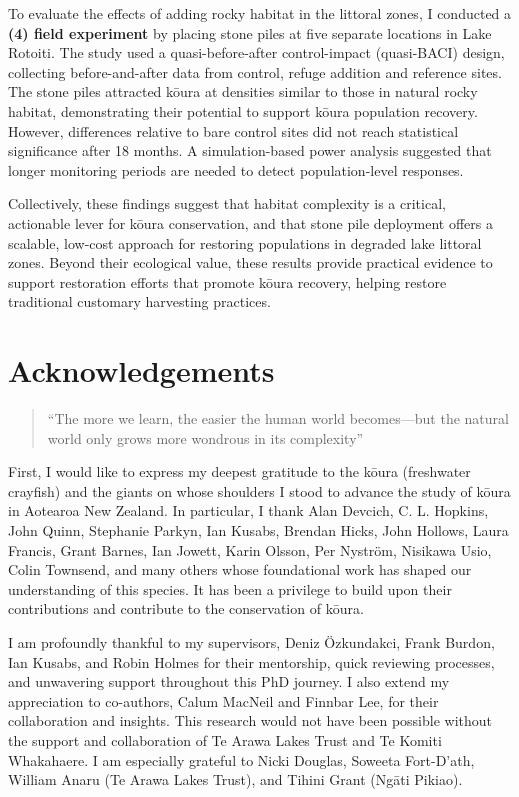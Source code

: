 \documentclass[
  12pt,
  a4paper,
  oneside]{scrbook}
\begin{document}
To evaluate the effects of adding rocky habitat in the littoral zones, I
conducted a \textbf{(4) field experiment} by placing stone piles at five
separate locations in Lake Rotoiti. The study used a quasi-before-after
control-impact (quasi-BACI) design, collecting before-and-after data
from control, refuge addition and reference sites. The stone piles
attracted kōura at densities similar to those in natural rocky habitat,
demonstrating their potential to support kōura population recovery.
However, differences relative to bare control sites did not reach
statistical significance after 18 months. A simulation-based power
analysis suggested that longer monitoring periods are needed to detect
population-level responses.

Collectively, these findings suggest that habitat complexity is a
critical, actionable lever for kōura conservation, and that stone pile
deployment offers a scalable, low-cost approach for restoring
populations in degraded lake littoral zones. Beyond their ecological
value, these results provide practical evidence to support restoration
efforts that promote kōura recovery, helping restore traditional
customary harvesting practices.

\chapter*{Acknowledgements}\label{acknowledgements}

\begin{quote}
``The more we learn, the easier the human world becomes---but the
natural world only grows more wondrous in its complexity''
\end{quote}

First, I would like to express my deepest gratitude to the kōura
(freshwater crayfish) and the giants on whose shoulders I stood to
advance the study of kōura in Aotearoa New Zealand. In particular, I
thank Alan Devcich, C. L. Hopkins, John Quinn, Stephanie Parkyn, Ian
Kusabs, Brendan Hicks, John Hollows, Laura Francis, Grant Barnes, Ian
Jowett, Karin Olsson, Per Nyström, Nisikawa Usio, Colin Townsend, and
many others whose foundational work has shaped our understanding of this
species. It has been a privilege to build upon their contributions and
contribute to the conservation of kōura.

I am profoundly thankful to my supervisors, Deniz Özkundakci, Frank
Burdon, Ian Kusabs, and Robin Holmes for their mentorship, quick
reviewing processes, and unwavering support throughout this PhD journey.
I also extend my appreciation to co-authors, Calum MacNeil and Finnbar
Lee, for their collaboration and insights. This research would not have
been possible without the support and collaboration of Te Arawa Lakes
Trust and Te Komiti Whakahaere. I am especially grateful to Nicki
Douglas, Soweeta Fort-D'ath, William Anaru (Te Arawa Lakes Trust), and
Tihini Grant (Ngāti Pikiao).
\end{document}
